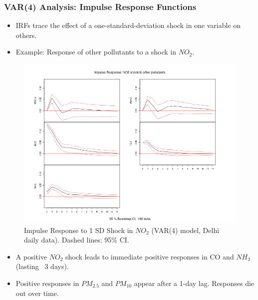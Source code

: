 \documentclass[svgnames, 12pt]{beamer}
\begin{document}
\begin{frame}
    \frametitle{VAR(4) Analysis: Impulse Response Functions}
    \begin{itemize}
        \item IRFs trace the effect of a one-standard-deviation shock in one variable on others.
        \item Example: Response of other pollutants to a shock in $NO_2$.
    \end{itemize}
    \begin{figure}
        \includegraphics[width=0.9\linewidth]{../analysis/assets/irf_no2_others.png}
        \caption{Impulse Response to 1 SD Shock in $NO_2$ (VAR(4) model, Delhi daily data). Dashed lines: 95\% CI.}
    \end{figure}
    \begin{itemize}
        \item \footnotesize A positive $NO_2$ shock leads to immediate positive responses in CO and $NH_3$ (lasting ~3 days).
        \item \footnotesize Positive responses in $PM_{2.5}$ and $PM_{10}$ appear after a 1-day lag. Responses die out over time.
    \end{itemize}
\end{frame}
\end{document}
